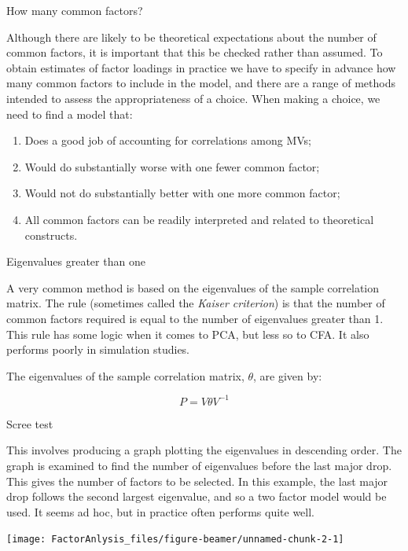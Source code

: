 \documentclass[10pt,ignorenonframetext,]{beamer}
\providecommand{\tightlist}{%
\setlength{\itemsep}{0pt}\setlength{\parskip}{0pt}}
\begin{document}
\begin{frame}{How many common factors?}

Although there are likely to be theoretical expectations about the
number of common factors, it is important that this be checked rather
than assumed. To obtain estimates of factor loadings in practice we have
to specify in advance how many common factors to include in the model,
and there are a range of methods intended to assess the appropriateness
of a choice. When making a choice, we need to find a model that:

\begin{enumerate}
\def\labelenumi{\arabic{enumi}.}
\tightlist
\item
  Does a good job of accounting for correlations among MVs;
\item
  Would do substantially worse with one fewer common factor;
\item
  Would not do substantially better with one more common factor;
\item
  All common factors can be readily interpreted and related to
  theoretical constructs.
\end{enumerate}

\end{frame}

\begin{frame}{Eigenvalues greater than one}

A very common method is based on the eigenvalues of the sample
correlation matrix. The rule (sometimes called the \emph{Kaiser
criterion}) is that the number of common factors required is equal to
the number of eigenvalues greater than 1. This rule has some logic when
it comes to PCA, but less so to CFA. It also performs poorly in
simulation studies.

The eigenvalues of the sample correlation matrix, \(\theta\), are given
by:

\[
P = V \theta V^{-1}
\]

\end{frame}

\begin{frame}{Scree test}

This involves producing a graph plotting the eigenvalues in descending
order. The graph is examined to find the number of eigenvalues before
the last major drop. This gives the number of factors to be selected. In
this example, the last major drop follows the second largest eigenvalue,
and so a two factor model would be used. It seems ad hoc, but in
practice often performs quite well.

\texttt{[image: FactorAnlysis\_files/figure-beamer/unnamed-chunk-2-1]}

\end{frame}
\end{document}
